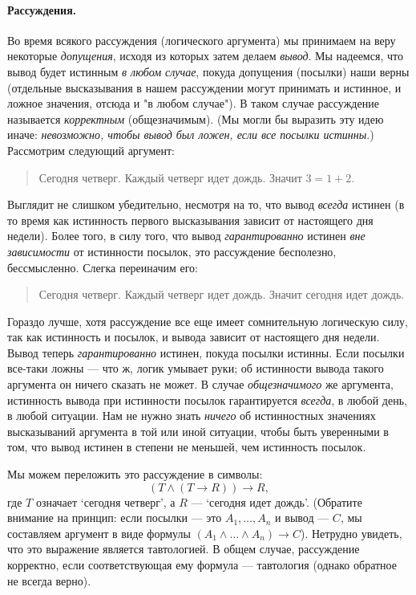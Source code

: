 \documentclass[12pt,notitlepage]{article}
\theoremstyle{plain}
\theoremstyle{definition}
\theoremstyle{plain}
\newcommand{\1}{\mathbf{1}}
\newcommand{\0}{\mathbf{0}}
\newcommand{\mcomm}[1]{}
\begin{document}
\paragraph{Рассуждения.} Во время всякого рассуждения (логического аргумента) мы принимаем на веру некоторые \emph{допущения}, исходя из которых затем делаем \emph{вывод}. Мы надеемся, что вывод будет истинным \emph{в любом случае}, покуда допущения (посылки) наши верны (отдельные высказывания в нашем рассуждении могут принимать и истинное, и ложное значения, отсюда и "в любом случае"). В таком случае рассуждение называется \emph{корректным} (общезначимым). (Мы могли бы выразить эту идею иначе: \emph{невозможно, чтобы вывод был ложен, если все посылки истинны}.) Рассмотрим следующий аргумент:
\begin{quote}
	Сегодня четверг. Каждый четверг идет дождь. Значит $3 = 1 + 2$.
\end{quote}
Выглядит не слишком убедительно, несмотря на то, что вывод \emph{всегда} истинен (в то время как истинность первого высказывания зависит от настоящего дня недели). Более того, в силу того, что вывод \emph{гарантированно} истинен \emph{вне зависимости} от истинности посылок, это рассуждение бесполезно, бессмысленно. Слегка переиначим его:
\begin{quote}
	Сегодня четверг. Каждый четверг идет дождь. Значит сегодня идет дождь.
\end{quote}
Гораздо лучше, хотя рассуждение все еще имеет сомнительную логическую силу, так как истинность и посылок, и вывода зависит от настоящего дня недели. Вывод теперь \emph{гарантированно} истинен, покуда посылки истинны. Если посылки все-таки ложны --- что ж, логик умывает руки; об истинности вывода такого аргумента он ничего сказать не может. В случае \emph{общезначимого} же аргумента, истинность вывода при истинности посылок гарантируется \emph{всегда}, в любой день, в любой ситуации. Нам не нужно знать \emph{ничего} об истинностных значениях высказываний аргумента в той или иной ситуации, чтобы быть уверенными в том, что вывод истинен в степени не меньшей, чем истинность посылок.

\mcomm{}

Мы можем переложить это рассуждение в символы:
$$(T \wedge (T \to R)) \to R,$$
где $T$ означает `сегодня четверг', а $R$ --- `сегодня идет дождь'. (Обратите внимание на принцип: если посылки --- это $A_1, \ldots, A_n$ и вывод --- $C$, мы составляем аргумент в виде формулы $(A_1 \wedge  \ldots \wedge A_n) \to C$). Нетрудно увидеть, что это выражение является тавтологией. В общем случае, рассуждение корректно, если соответствующая ему формула --- тавтология (однако обратное не всегда верно).
\end{document}
